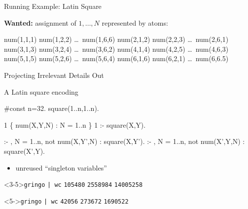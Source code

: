 \begin{frame}{Running Example: Latin Square}
\begin{minipage}[t]{0.52\linewidth}
\begin{block}{\textbf{Wanted:} assignment of $1,\dots,N$}
represented by atoms:
\vspace*{-2mm}\footnotesize
\begin{semiverbatim}
num(1,1,1) num(1,2,2) \dots\ num(1,6,6)
num(2,1,2) num(2,2,3) \dots\ num(2,6,1)
num(3,1,3) num(3,2,4) \dots\ num(3,6,2)
num(4,1,4) num(4,2,5) \dots\ num(4,6,3)
num(5,1,5) num(5,2,6) \dots\ num(5,6,4)
num(6,1,6) num(6,2,1) \dots\ num(6,6.5)
\end{semiverbatim}
\vspace*{-2mm}
\end{block}
\end{minipage}%
\end{frame}
\begin{frame}[fragile]{Projecting Irrelevant Details Out}
\begin{block}{A Latin square encoding}
\vspace*{-4mm}\footnotesize
\begin{semiverbatim}
#const n=32. square(1..n,1..n).

1 \{ num(X,Y,N) : N = 1..n \} 1 :- square(X,Y).

:- , N = 1..n, not num(X,Y',N) : square(X,Y').
:- , N = 1..n, not num(X',Y,N) : square(X',Y).
\end{semiverbatim}
\vspace*{-2mm}
\end{block}
\vspace*{-2mm}
\begin{itemize}
\item<2-3> \alert<2>{unreused ``singleton variables''}
\end{itemize}
\vspace*{-4mm}
\begin{minipage}[t]{0.47\linewidth}%
\begin{block}<3-5>{\lstinline{gringo}  \lstinline{| wc}}
\lstinline{105480} \alert<5>{\lstinline{2558984}} \lstinline{14005258}
\end{block}
\end{minipage}\hfill
\begin{minipage}[t]{0.47\linewidth}%
\begin{block}<5->{\lstinline{gringo}  \lstinline{| wc}}
\lstinline{42056} \alert<5>{\lstinline{273672}} \lstinline{1690522}
\end{block}
\end{minipage}
\end{frame}

